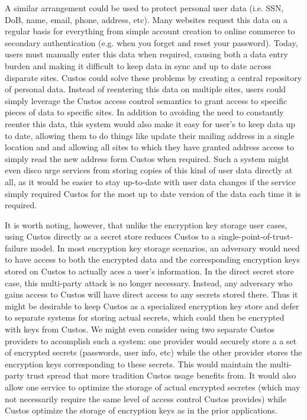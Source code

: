 A similar arrangement could be used to protect personal user data
(i.e. SSN, DoB, name, email, phone, address, etc). Many websites
request this data on a regular basis for everything from simple
account creation to online commerce to secondary authentication
(e.g. when you forget and reset your password). Today, users must
manually enter this data when required, causing both a data entry
burden and making it difficult to keep data in sync and up to date
across disparate sites. Custos could solve these problems by creating
a central repository of personal data. Instead of reentering this data
on multiple sites, users could simply leverage the Custos access
control semantics to grant access to specific pieces of data to
specific sites. In addition to avoiding the need to constantly reenter
this data, this system would also make it easy for user's to keep data
up to date, allowing them to do things like update their mailing
address in a single location and and allowing all sites to which they
have granted address access to simply read the new address form Custos
when required. Such a system might even disco urge services from
storing copies of this kind of user data directly at all, as it would
be easier to stay up-to-date with user data changes if the service
simply required Custos for the most up to date version of the data
each time it is required.

It is worth noting, however, that unlike the encryption key storage
user cases, using Custos directly as a secret store reduces Custos to
a single-point-of-trust-failure model. In most encryption key storage
scenarios, an adversary would need to have access to both the
encrypted data and the corresponding encryption keys stored on Custos
to actually aces a user's information. In the direct secret store
case, this multi-party attack is no longer necessary. Instead, any
adversary who gains access to Custos will have direct access to any
secrets stored there. Thus it might be desirable to keep Custos as a
specialized encryption key store and defer to separate systems for
storing actual secrets, which could then be encrypted with keys from
Custos. We might even consider using two separate Custos providers to
accomplish such a system: one provider would securely store a a set of
encrypted secrets (passwords, user info, etc) while the other provider
stores the encryption keys corresponding to these secrets. This would
maintain the multi-party trust spread that more tradition Custos usage
benefits from. It would also allow one service to optimize the storage
of actual encrypted secretes (which may not necessarily require the
same level of access control Custos provides) while Custos optimize
the storage of encryption keys as in the prior applications.

